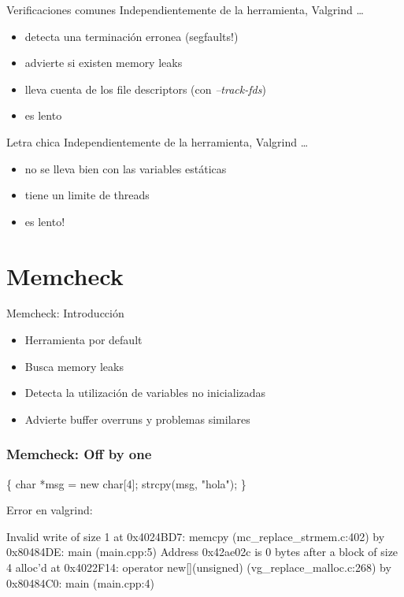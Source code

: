 \documentclass{beamer}
\begin{document}
\begin{frame}{Verificaciones comunes}
Independientemente de la herramienta, Valgrind \ldots
\begin{itemize}
  \item detecta una terminaci\'on erronea (segfaults!)
  \item advierte si existen memory leaks
  \item lleva cuenta de los file descriptors (con \textit{--track-fds})
  \item es lento
\end{itemize}
\end{frame}

\begin{frame}{Letra chica}
Independientemente de la herramienta, Valgrind \ldots
\begin{itemize}
  \item no se lleva bien con las variables est\'aticas
  \item tiene un limite de threads
  \item \alert{ es lento! }
\end{itemize}
\end{frame}


\section{Memcheck}

\begin{frame}{Memcheck: Introducci\'on}
\begin{itemize}
  \item Herramienta por default
  \item Busca memory leaks
  \item Detecta la utilizaci\'on de variables no inicializadas
  \item Advierte buffer overruns y problemas similares
\end{itemize}
\rule{0em}{20pt}
\end{frame}

\begin{frame}[fragile, shrink=25]
\frametitle{Memcheck: Off by one}
\begin{semiverbatim}
\{
  char *msg = new char[4];
  strcpy(msg, "hola");
\}
\end{semiverbatim}

Error en valgrind:
\begin{semiverbatim}
\alert{ Invalid write } of size 1
   at 0x4024BD7: memcpy (mc_replace_strmem.c:402)
   by 0x80484DE: main \alert{ (main.cpp:5) }
 Address 0x42ae02c is \alert{ 0 bytes after a block of size 4 alloc'd }
   at 0x4022F14: operator new[](unsigned) (vg_replace_malloc.c:268)
   by 0x80484C0: main \alert{ (main.cpp:4) }
\end{semiverbatim}
\end{frame}
\end{document}
